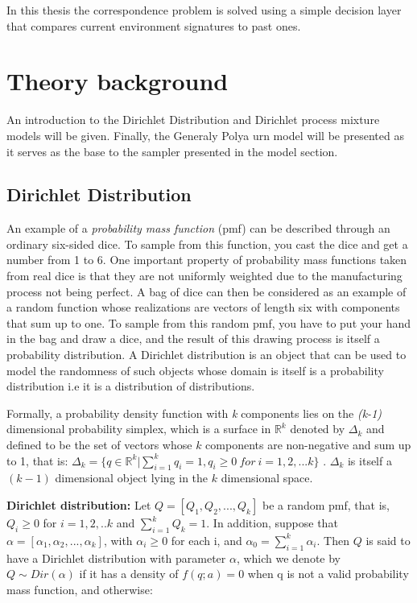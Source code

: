 \documentclass [twoside,hidelinks]{article}
\begin{document}
In this thesis the correspondence problem is solved using a simple decision layer that compares current environment signatures to past ones.


\newpage
\section{Theory background}
\label{sec:theory}


An introduction to the Dirichlet Distribution and Dirichlet process mixture models will be given. Finally, the Generaly Polya urn model will be presented as it serves as the base to the sampler presented in the model section.

\subsection{Dirichlet Distribution}

An example of a \textit{probability mass function} (pmf) can be described through an ordinary six-sided dice. To sample from this function, you cast the dice and get a number from 1 to 6. One important property of probability mass functions taken from real dice is that they are not uniformly weighted due to the manufacturing process not being perfect. A bag of dice can then be considered as an example of a random function whose realizations are vectors of length six with components that sum up to one. To sample from this random pmf, you have to put your hand in the bag and draw a dice, and the result of this drawing process is itself a probability distribution. A Dirichlet distribution is an object that can be used to model the randomness of such objects whose domain is itself is a probability distribution i.e it is a distribution of distributions.

Formally, a probability density function with \textit{k} components lies on the \textit{ (k-1)} dimensional probability simplex, which is a surface in $ \mathbb{R}^k $ denoted by $ \Delta_k $ and defined to be the set of vectors whose $ k $  components are non-negative and sum up to 1, that is:  $ \Delta_k = \{ q \in  \mathbb{R}^k | \sum_{i=1}^k q_i=1, q_i \geq 0\ for\ i=1,2,...k \} $ . $ \Delta_k $  is itself a $  ( k-1 ) $ dimensional object lying in the $k$ dimensional space. 

\textbf{Dirichlet distribution:} Let $ Q =  [Q_1,Q_2,...,Q_k  ] $ be a random pmf, that is, $ Q_i \geq 0 $ for $ i=1,2,..k $ and $ \sum_{i=1}^k Q_k=1 $. In addition, suppose that $ \alpha =  [\alpha_1, \alpha_2, ..., \alpha_k ] $, with $ \alpha_i  \ge  0 $ for each i, and $ \alpha_0 = \sum_{i=1}^k \alpha_i $. Then $ Q $ is said to have a Dirichlet distribution with parameter $\alpha$, which we denote by $ Q \sim  Dir (\alpha)$ if it has a density of $f (q;a) = 0$ when q is not a valid probability mass function, and otherwise:
\end{document}
